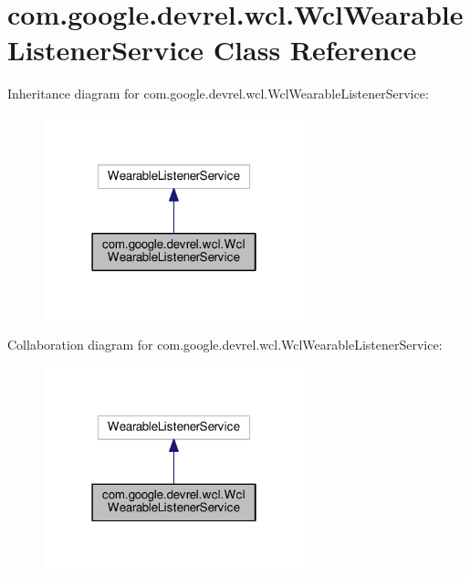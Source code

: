 \hypertarget{classcom_1_1google_1_1devrel_1_1wcl_1_1WclWearableListenerService}{}\section{com.\+google.\+devrel.\+wcl.\+Wcl\+Wearable\+Listener\+Service Class Reference}
\label{classcom_1_1google_1_1devrel_1_1wcl_1_1WclWearableListenerService}


Inheritance diagram for com.\+google.\+devrel.\+wcl.\+Wcl\+Wearable\+Listener\+Service\+:
\nopagebreak
\begin{figure}[H]
\begin{center}
\leavevmode
\includegraphics[width=214pt]{da/dae/classcom_1_1google_1_1devrel_1_1wcl_1_1WclWearableListenerService__inherit__graph}
\end{center}
\end{figure}


Collaboration diagram for com.\+google.\+devrel.\+wcl.\+Wcl\+Wearable\+Listener\+Service\+:
\nopagebreak
\begin{figure}[H]
\begin{center}
\leavevmode
\includegraphics[width=214pt]{d6/d3b/classcom_1_1google_1_1devrel_1_1wcl_1_1WclWearableListenerService__coll__graph}
\end{center}
\end{figure}
